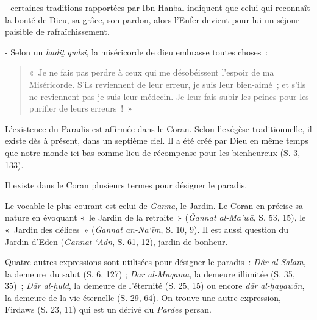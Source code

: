 - certaines traditions rapportées par Ibn Hanbal indiquent que celui qui
reconnaît la bonté de Dieu, sa grâce, son pardon, alors l'Enfer devient
pour lui un séjour paisible de rafraîchissement.

- Selon un \emph{hadiṯ qudsi}, la miséricorde de dieu embrasse toutes
choses~: 
\begin{quote}
    «~Je ne fais pas perdre à ceux qui me désobéissent l'espoir de
ma Miséricorde. S'ils reviennent de leur erreur, je suis leur
bien-aimé~; et s'ils ne reviennent pas je suis leur médecin. Je leur
fais subir les peines pour les purifier de leurs erreurs~!~»
\end{quote}




L'existence du Paradis est affirmée dans le Coran. Selon l'exégèse
traditionnelle, il existe dès à présent, dans un septième ciel. Il a été
créé par Dieu en même temps que notre monde ici-bas comme lieu de
récompense pour les bienheureux (S. 3, 133).

Il existe dans le Coran plusieurs termes pour désigner le paradis.

Le vocable le plus courant est celui de \emph{Ǧanna}, le Jardin. Le
Coran en précise sa nature en évoquant «~le Jardin de la retraite~»
(\emph{Ǧannat al-Ma'wā}, S. 53, 15), le «~Jardin des délices~»
(\emph{Ǧannat an-Na`īm}, S. 10, 9). Il est aussi question du Jardin
d'Eden (\emph{Ǧannat} \emph{`Adn}, S. 61, 12), jardin de bonheur.

Quatre autres expressions sont utilisées pour désigner le paradis~:
\emph{Dâr al-Salām}, la demeure~du salut (S. 6, 127) ; \emph{Dār
al-Muqāma}, la demeure illimitée (S. 35, 35)~; \emph{Dār al-ḫuld}, la
demeure de l'éternité (S. 25, 15) ou encore \emph{dār}
\emph{al-ḥayawān}, la demeure de la vie éternelle (S. 29, 64). On trouve
une autre expression, Firdaws (S. 23, 11) qui est un dérivé du
\emph{Pardes} persan.

